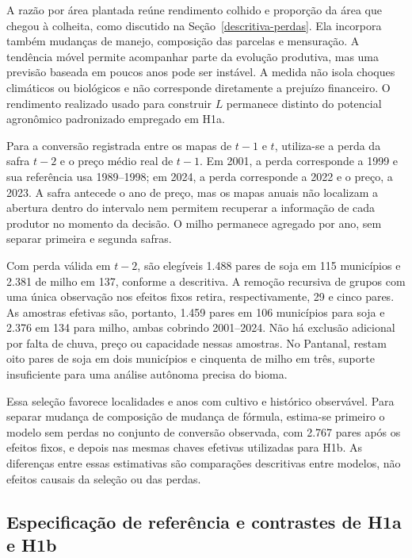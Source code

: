 A razão por área plantada reúne rendimento colhido e proporção da área que chegou à colheita, como discutido na Seção~\ref{descritiva-perdas}. Ela incorpora também mudanças de manejo, composição das parcelas e mensuração. A tendência móvel permite acompanhar parte da evolução produtiva, mas uma previsão baseada em poucos anos pode ser instável. A medida não isola choques climáticos ou biológicos e não corresponde diretamente a prejuízo financeiro. O rendimento realizado usado para construir $L$ permanece distinto do potencial agronômico padronizado empregado em H1a.

Para a conversão registrada entre os mapas de $t-1$ e $t$, utiliza-se a perda da safra $t-2$ e o preço médio real de $t-1$. Em 2001, a perda corresponde a 1999 e sua referência usa 1989--1998; em 2024, a perda corresponde a 2022 e o preço, a 2023. A safra antecede o ano de preço, mas os mapas anuais não localizam a abertura dentro do intervalo nem permitem recuperar a informação de cada produtor no momento da decisão. O milho permanece agregado por ano, sem separar primeira e segunda safras.

Com perda válida em $t-2$, são elegíveis 1.488 pares de soja em 115 municípios e 2.381 de milho em 137, conforme a descritiva. A remoção recursiva de grupos com uma única observação nos efeitos fixos retira, respectivamente, 29 e cinco pares. As amostras efetivas são, portanto, 1.459 pares em 106 municípios para soja e 2.376 em 134 para milho, ambas cobrindo 2001--2024. Não há exclusão adicional por falta de chuva, preço ou capacidade nessas amostras. No Pantanal, restam oito pares de soja em dois municípios e cinquenta de milho em três, suporte insuficiente para uma análise autônoma precisa do bioma.

Essa seleção favorece localidades e anos com cultivo e histórico observável. Para separar mudança de composição de mudança de fórmula, estima-se primeiro o modelo sem perdas no conjunto de conversão observada, com 2.767 pares após os efeitos fixos, e depois nas mesmas chaves efetivas utilizadas para H1b. As diferenças entre essas estimativas são comparações descritivas entre modelos, não efeitos causais da seleção ou das perdas.

\subsection{Especificação de referência e contrastes de H1a e H1b}
\label{estrategia-especificacao}

